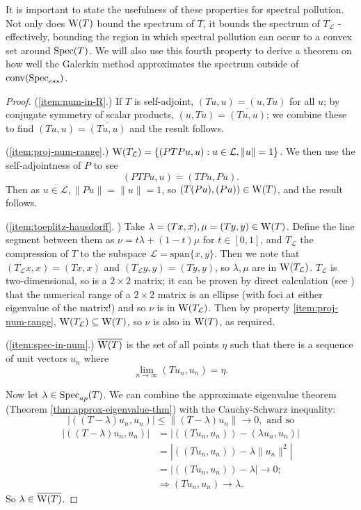 \documentclass[../main.tex]{subfiles}
\begin{document}
It is important to state the usefulness of these properties for spectral
pollution. Not only does $\mathrm{W}(T)$ bound the spectrum of $T$, it bounds the
spectrum of $T_\mathcal{L}$ - effectively, bounding the region in which spectral
pollution can occur to a convex set around $\mathrm{Spec}(T)$.
We will also use this fourth property to derive a theorem on how well the
Galerkin method approximates the spectrum outside of $\mathrm{conv}(\mathrm{Spec}_{ess})$.

\begin{proof}
(\ref{item:num-in-R}.) If $T$ is self-adjoint, 
$(Tu, u) = (u, Tu)$ for all $u$;
by conjugate symmetry of scalar products, 
$(u, Tu) = \overline{(Tu, u)}$;
we combine these to find 
$(Tu, u) = \overline{(Tu, u)}$
and the result follows. 

(\ref{item:proj-num-range}.) 
$\mathrm{W}(T_\mathcal{L}) = \{( PTPu, u ) : u \in \mathcal{L}, \|u\|=1\}$.
We then use the self-adjointness of $P$ to see
$$( PTPu, u ) = ( TPu, Pu ).$$
Then as $u \in \mathcal{L}, \|Pu\| = \|u\| = 1$,
so $( T(Pu), (Pu) ) \in \mathrm{W}(T)$, and the result follows.

(\ref{item:toeplitz-hausdorff}. 
\cite{gustafson1997numerical})
Take $\lambda = (Tx, x), \mu = (Ty, y) \in \mathrm{W}(T)$. Define the line segment
between them as $\nu = t\lambda + (1-t)\mu$ for $t \in [0, 1]$, and
$T_\mathcal{L}$ the compression of $T$ to the subspace 
$\mathcal{L} = \text{span}\{x, y\}$.
Then we note that $(T_\mathcal{L} x, x) = (Tx, x)$ and $(T_\mathcal{L} y, y) =
(Ty, y)$, so $\lambda, \mu$ are in $\mathrm{W}(T_\mathcal{L})$.
$T_\mathcal{L}$ is two-dimensional, so is a $2 \times 2$ matrix; it can
be proven by direct calculation (see \cite{gustafson1997numerical}) that
the numerical range of a $2 \times 2$ matrix is an ellipse (with foci at
either eigenvalue of the matrix!) and so $\nu$ is in
$\mathrm{W}(T_\mathcal{L})$.
Then by property \ref{item:proj-num-range}, $\mathrm{W}(T_\mathcal{L}) \subseteq
\mathrm{W}(T)$, so $\nu$ is also in $\mathrm{W}(T)$, as required.

(\ref{item:spec-in-num}.) $\overline{\mathrm{W}(T)}$ is the set of all points $\eta$
such that there is a sequence of unit vectors $u_n$ where
$$\lim_{n\rightarrow \infty}( Tu_n, u_n ) = \eta.$$

Now let $\lambda \in \mathrm{Spec}_{ap}(T)$. We can combine the approximate eigenvalue
theorem (Theorem \ref{thm:approx-eigenvalue-thm}) with the
Cauchy-Schwarz inequality: 
$$|( (T - \lambda)u_n, u_n )| \leq \|(T - \lambda)u_n\| \rightarrow 0,\text{ and so}$$
\begin{equation*}
\begin{split}
|( (T - \lambda)u_n, u_n )| &  = |( (Tu_n, u_n) ) - ( \lambda u_n, u_n )| \\
& = |( (Tu_n, u_n) ) - \lambda \|u_n\|^2| \\
& = |( (Tu_n, u_n) ) - \lambda| \rightarrow 0; \\
& \Rightarrow ( Tu_n, u_n ) \rightarrow \lambda.
\end{split}
\end{equation*}
So $\lambda \in \overline{\mathrm{W}(T)}$.
\end{proof}
\end{document}
